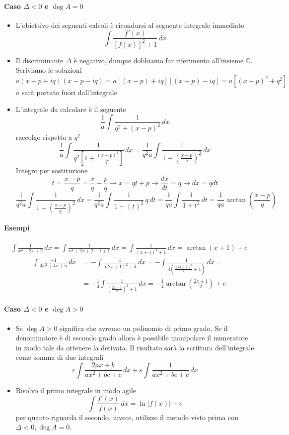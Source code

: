 \documentclass[11pt]{article}
\begin{document}
\paragraph{Caso $\Delta < 0$ e $\deg A =0$} 
\begin{itemize}
	\item L'obiettivo dei seguenti calcoli è ricondursi al seguente integrale immediato
	\[\int\frac{f'(x)}{\left[f(x)\right]^2+1}\,dx\]
	\item Il discriminante $\Delta$ è negativo, dunque dobbiamo far riferimento all'insieme $\mathbb{C}$. Scriviamo le soluzioni
	\[a(x-p+iq)(x-p-iq)=a[(x-p)+iq][(x-p)-iq]=a[(x-p)^2+q^2]\]
	$a$ sarà portato fuori dall'integrale
	\item L'integrale da calcolare è il seguente
	\[\frac{1}{a}\int\frac{1}{q^2+(x-p)^2}\,dx\]
	raccolgo rispetto a $q^2$
	\[\frac{1}{a}\int\frac{1}{q^2\left[1+\frac{(x-p)^2}{q^2}\right]}\,dx=\frac{1}{q^2a}\int \frac{1}{1+\left(\frac{x-p}{q}\right)^2}\,dx\]
	Integro per sostituzione
	\[t=\frac{x-p}{q}=\frac{x}{q}-\frac{p}{q} \longrightarrow  \boxed{x= qt+p} \longrightarrow \frac{dx}{dt}=q \longrightarrow \boxed{dx = q dt}\]
	\[\frac{1}{q^2a}\int \frac{1}{1+\left(\frac{x-p}{q}\right)^2}\,dx=\frac{1}{q^2a}\int \frac{1}{1+\left(t\right)^2}\,q\,dt=\frac{1}{qa}\int \frac{1}{1+t^2}\,dt=\boxed{\frac{1}{qa}\arctan\left(\frac{x-p}{q}\right)}\]
\end{itemize}
\paragraph{Esempi}
\begin{align*} \int \frac{1}{x^2+2x+2}\,dx=\int \frac{1}{x^2+2x+2-1+1}\,dx=\int \frac{1}{(x+1)^2+1}\,dx=\arctan(x+1)+c \end{align*}
\begin{align*} \int \frac{-1}{4x^2+4x+5}\,dx&=-\int \frac{1}{(2x+1)^2+4}\,dx=-\int \frac{1}{4\left(\frac{(2x+1)^2}{4}+1\right)}\,dx=\\&=-\frac{1}{4}\int \frac{1}{\left(\frac{2x+1}{2}\right)^2+1}\,dx=-\frac{1}{4}\arctan\left(\frac{2x+1}{2}\right)+c\end{align*}
\paragraph{Caso $\Delta < 0$ e $\deg A > 0$} 
\begin{itemize}
	\item Se $\deg A > 0$ significa che avremo un polinomio di primo grado. Se il denominatore è di secondo grado allora è possibile manipolare il numeratore in modo tale da ottenere la derivata. Il risultato sarà la scrittura dell'integrale come somma di due integrali
	\[r\int\frac{2ax+b}{ax^2+bc+c}\,dx+s\int\frac{1}{ax^2+bc+c}\,dx\]
	\item Risolvo il primo integrale in modo agile
	\[\int \frac{f'(x)}{f(x)}\,dx=\ln|f(x)|+c\]
	per quanto riguarda il secondo, invece, utilizzo il metodo visto prima con $\Delta < 0, \deg A =0$.
\end{itemize}
\end{document}
